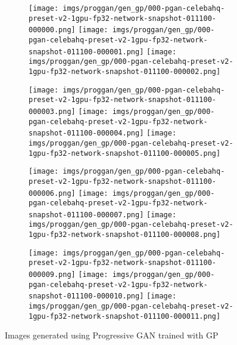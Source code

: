 \documentclass{article}
\begin{document}
\begin{figure}[h]
  \begin{subfigure}{\linewidth}
  \texttt{[image: imgs/proggan/gen\_gp/000-pgan-celebahq-preset-v2-1gpu-fp32-network-snapshot-011100-000000.png]}
  \texttt{[image: imgs/proggan/gen\_gp/000-pgan-celebahq-preset-v2-1gpu-fp32-network-snapshot-011100-000001.png]}
  \texttt{[image: imgs/proggan/gen\_gp/000-pgan-celebahq-preset-v2-1gpu-fp32-network-snapshot-011100-000002.png]}
  \end{subfigure}\par
  \begin{subfigure}{\linewidth}
  \texttt{[image: imgs/proggan/gen\_gp/000-pgan-celebahq-preset-v2-1gpu-fp32-network-snapshot-011100-000003.png]}
  \texttt{[image: imgs/proggan/gen\_gp/000-pgan-celebahq-preset-v2-1gpu-fp32-network-snapshot-011100-000004.png]}
  \texttt{[image: imgs/proggan/gen\_gp/000-pgan-celebahq-preset-v2-1gpu-fp32-network-snapshot-011100-000005.png]}
  \end{subfigure}\par
  \begin{subfigure}{\linewidth}
  \texttt{[image: imgs/proggan/gen\_gp/000-pgan-celebahq-preset-v2-1gpu-fp32-network-snapshot-011100-000006.png]}
  \texttt{[image: imgs/proggan/gen\_gp/000-pgan-celebahq-preset-v2-1gpu-fp32-network-snapshot-011100-000007.png]}
  \texttt{[image: imgs/proggan/gen\_gp/000-pgan-celebahq-preset-v2-1gpu-fp32-network-snapshot-011100-000008.png]}
  \end{subfigure}
  \begin{subfigure}{\linewidth}
  \texttt{[image: imgs/proggan/gen\_gp/000-pgan-celebahq-preset-v2-1gpu-fp32-network-snapshot-011100-000009.png]}
  \texttt{[image: imgs/proggan/gen\_gp/000-pgan-celebahq-preset-v2-1gpu-fp32-network-snapshot-011100-000010.png]}
  \texttt{[image: imgs/proggan/gen\_gp/000-pgan-celebahq-preset-v2-1gpu-fp32-network-snapshot-011100-000011.png]}
  \end{subfigure}
  \caption{Images generated using Progressive GAN trained with GP}
  \label{proggan_gp}
\end{figure}
\end{document}
